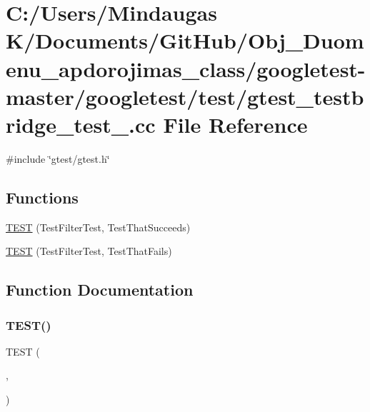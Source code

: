 \hypertarget{googletest-master_2googletest_2test_2gtest__testbridge__test___8cc}{}\section{C\+:/\+Users/\+Mindaugas K/\+Documents/\+Git\+Hub/\+Obj\+\_\+\+Duomenu\+\_\+apdorojimas\+\_\+class/googletest-\/master/googletest/test/gtest\+\_\+testbridge\+\_\+test\+\_\+.cc File Reference}
\label{googletest-master_2googletest_2test_2gtest__testbridge__test___8cc}
{\ttfamily \#include \char`\"{}gtest/gtest.\+h\char`\"{}}\newline
\subsection*{Functions}
\begin{DoxyCompactItemize}
\item 
\mbox{\hyperlink{googletest-master_2googletest_2test_2gtest__testbridge__test___8cc_a5eeaeead411cc3c91e0eae2f2f4f5209}{T\+E\+ST}} (Test\+Filter\+Test, Test\+That\+Succeeds)
\item 
\mbox{\hyperlink{googletest-master_2googletest_2test_2gtest__testbridge__test___8cc_aaaf6981970e3fe120e682eb203630242}{T\+E\+ST}} (Test\+Filter\+Test, Test\+That\+Fails)
\end{DoxyCompactItemize}


\subsection{Function Documentation}
\mbox{\label{googletest-master_2googletest_2test_2gtest__testbridge__test___8cc_a5eeaeead411cc3c91e0eae2f2f4f5209}} 
\subsubsection{\texorpdfstring{TEST()}{TEST()}\hspace{0.1cm}{\footnotesize\ttfamily [1/2]}}
{\footnotesize\ttfamily T\+E\+ST (\begin{DoxyParamCaption}\item[{Test\+Filter\+Test}]{,  }\item[{Test\+That\+Succeeds}]{ }\end{DoxyParamCaption})}

